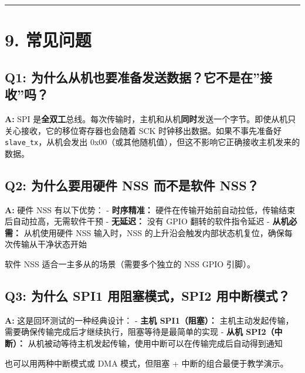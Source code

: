 \documentclass[
  chinese,
  UTF8,
  oneside,
  openany]{ctexbook}
\begin{document}
\begin{center}\rule{0.5\linewidth}{0.5pt}\end{center}

\section{9. 常见问题}\label{ux5e38ux89c1ux95eeux9898-3}

\subsection{Q1:
为什么从机也要准备发送数据？它不是在''接收''吗？}\label{q1-ux4e3aux4ec0ux4e48ux4eceux673aux4e5fux8981ux51c6ux5907ux53d1ux9001ux6570ux636eux5b83ux4e0dux662fux5728ux63a5ux6536ux5417}

\textbf{A:} SPI
是\textbf{全双工}总线。每次传输时，主机和从机\textbf{同时}发送一个字节。即使从机只关心接收，它的移位寄存器也会随着
SCK 时钟移出数据。如果不事先准备好 \texttt{slave\_tx}，从机会发出
0x00（或其他随机值），但这不影响它正确接收主机发来的数据。

\subsection{Q2: 为什么要用硬件 NSS 而不是软件
NSS？}\label{q2-ux4e3aux4ec0ux4e48ux8981ux7528ux786cux4ef6-nss-ux800cux4e0dux662fux8f6fux4ef6-nss}

\textbf{A:} 硬件 NSS 有以下优势： - \textbf{时序精准：}
硬件在传输开始前自动拉低，传输结束后自动拉高，无需软件干预 -
\textbf{无延迟：} 没有 GPIO 翻转的软件指令延迟 - \textbf{从机必需：}
从机使用硬件 NSS 输入时，NSS
的上升沿会触发内部状态机复位，确保每次传输从干净状态开始

软件 NSS 适合一主多从的场景（需要多个独立的 NSS GPIO 引脚）。

\subsection{Q3: 为什么 SPI1 用阻塞模式，SPI2
用中断模式？}\label{q3-ux4e3aux4ec0ux4e48-spi1-ux7528ux963bux585eux6a21ux5f0fspi2-ux7528ux4e2dux65adux6a21ux5f0f}

\textbf{A:} 这是回环测试的一种经典设计： - \textbf{主机 SPI1（阻塞）：}
主机主动发起传输，需要确保传输完成后才继续执行，阻塞等待是最简单的实现 -
\textbf{从机 SPI2（中断）：}
从机被动等待主机发起传输，使用中断可以在传输完成后自动得到通知

也可以用两种中断模式或 DMA 模式，但阻塞 + 中断的组合最便于教学演示。
\end{document}
